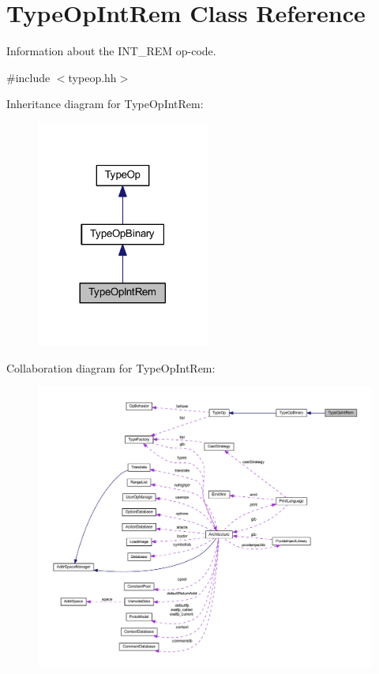 \hypertarget{class_type_op_int_rem}{}\section{Type\+Op\+Int\+Rem Class Reference}
\label{class_type_op_int_rem}


Information about the I\+N\+T\+\_\+\+R\+EM op-\/code.  




{\ttfamily \#include $<$typeop.\+hh$>$}



Inheritance diagram for Type\+Op\+Int\+Rem\+:
\nopagebreak
\begin{figure}[H]
\begin{center}
\leavevmode
\includegraphics[width=161pt]{class_type_op_int_rem__inherit__graph}
\end{center}
\end{figure}


Collaboration diagram for Type\+Op\+Int\+Rem\+:
\nopagebreak
\begin{figure}[H]
\begin{center}
\leavevmode
\includegraphics[width=350pt]{class_type_op_int_rem__coll__graph}
\end{center}
\end{figure}
